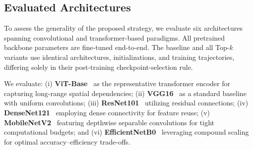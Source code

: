 \documentclass[runningheads]{llncs}
\begin{document}


\subsection{Evaluated Architectures}
To assess the generality of the proposed strategy, we evaluate six architectures spanning convolutional and transformer-based paradigms. All pretrained backbone parameters are fine-tuned end-to-end. The baseline and all Top-$k$ variants use identical architectures, initializations, and training trajectories, differing solely in their post-training checkpoint-selection rule.

We evaluate: (i) \textbf{ViT-Base}~\cite{dosovitskiy2021imageworth16x16words} as the representative transformer encoder for capturing long-range spatial dependencies; (ii) \textbf{VGG16}~\cite{simonyan2015vgg} as a standard baseline with uniform convolutions; (iii) \textbf{ResNet101}~\cite{he2016deep} utilizing residual connections; (iv) \textbf{DenseNet121}~\cite{huang2017densely} employing dense connectivity for feature reuse; (v) \textbf{MobileNetV2}~\cite{sandler2018mobilenetv2} featuring depthwise separable convolutions for tight computational budgets; and (vi) \textbf{EfficientNetB0}~\cite{tan2019efficientnet} leveraging compound scaling for optimal accuracy--efficiency trade-offs.
\end{document}
